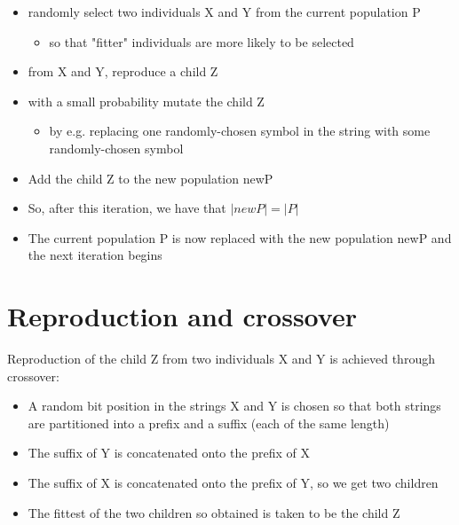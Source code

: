 \documentclass{article}[18pt]
\begin{document}
\begin{itemize}
	\item randomly select two individuals X and Y from the current population P
	\begin{itemize}
		\item so that "fitter" individuals are more likely to be selected
	\end{itemize}
	\item from X and Y, reproduce a child Z
	\item with a small probability mutate the child Z
	\begin{itemize}
		\item by e.g. replacing one randomly-chosen symbol in the string with some randomly-chosen symbol
	\end{itemize}
	\item Add the child Z to the new population newP
	\item So, after this iteration, we have that $|newP|=|P|$
	\item The current population P is now replaced with the new population newP and the next iteration begins
\end{itemize}
\section{Reproduction and crossover}
Reproduction of the child Z from two individuals X and Y is achieved through crossover:
\begin{itemize}
	\item A random bit position in the strings X and Y is chosen so that both strings are partitioned into a prefix and a suffix (each of the same length)
	\item The suffix of Y is concatenated onto the prefix of X
	\item The suffix of X is concatenated onto the prefix of Y, so we get two children
	\item The fittest of the two children so obtained is taken to be the child Z
\end{itemize}
\end{document}
